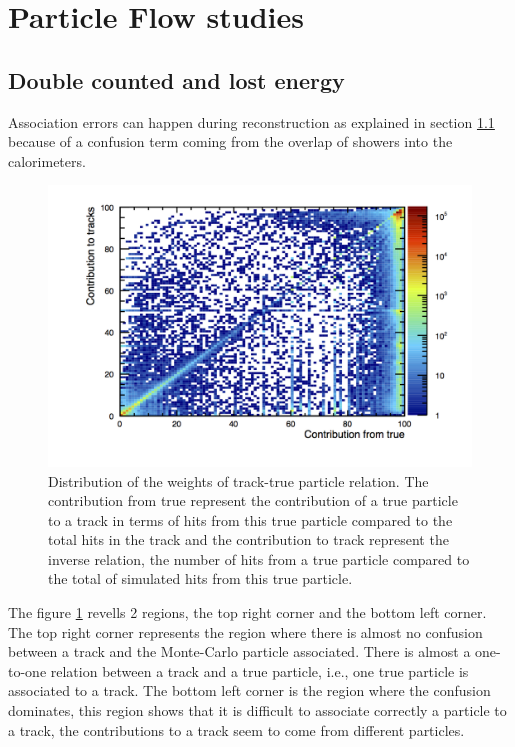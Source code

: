 \section{Particle Flow studies}

\subsection{Double counted and lost energy}

Association errors can happen during reconstruction as explained in section \ref{} because of a confusion term coming from the overlap of showers into the calorimeters.

\begin{figure}[htbp!]
  \centering
  \includegraphics[width=1\linewidth]{Appendixes/fig_SGV/weight_corr.png}
  \caption{Distribution of the weights of track-true particle relation. The contribution from true represent the contribution of a true particle to a track in terms of hits from this true particle compared to the total hits in the track and the contribution to track represent the inverse relation, the number of hits from a true particle compared to the total of simulated hits from this true particle.}
  \label{fig:weight_tracks}
\end{figure}

The figure \ref{fig:weight_tracks} revells 2 regions, the top right corner and the bottom left corner. The top right corner represents the region where there is almost no confusion between a track and the Monte-Carlo particle associated. There is almost a one-to-one relation between a track and a true particle, i.e., one true particle is associated to a track. The bottom left corner is the region where the confusion dominates, this region shows that it is difficult to associate correctly a particle to a track, the contributions to a track seem to come from different particles.

